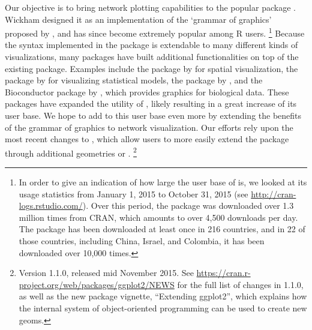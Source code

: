Our objective is to bring network plotting capabilities to the popular  package \citep{ggplot2}. Wickham designed it as an implementation of the `grammar of graphics' proposed by \citet{wilkinson:1999}, and  has since become extremely popular among R users.%
\footnote{In order to give an indication of how  large the user base of  is, we looked at its usage statistics from January 1, 2015 to October 31, 2015 (see \url{http://cran-logs.rstudio.com/}). Over this period, the  package was downloaded over 1.3 million times from CRAN, which amounts to over 4,500 downloads per day. The package has been downloaded at least once in 216 countries, and in 22 of those countries, including China, Israel, and Colombia, it has been downloaded over 10,000 times.} %
Because the syntax implemented in the  package is extendable to many different kinds of visualizations, many packages have built additional functionalities on top of the existing package. Examples include the  package by \citet{ggmap} for spatial visualization, the  package by \citet{ggfortify} for visualizing statistical models, the package  by \citet{ggally}, and the  Bioconductor package by \citet{ggbio}, which provides graphics for biological data.
These packages have expanded the utility of , likely resulting in a great increase of its user base. We hope to add to this user base even more by extending the benefits of the grammar of graphics to network visualization.
Our efforts rely upon the most recent changes to , which allow users to more easily extend the package through additional geometries or .%
\footnote{Version 1.1.0, released mid November 2015. See \url{https://cran.r-project.org/web/packages/ggplot2/NEWS} for the full list of changes in  1.1.0, as well as the new package vignette, ``Extending ggplot2'', which explains how the internal  system of object-oriented programming can be used to create new geoms.} %

